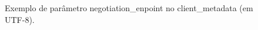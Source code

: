 \begin{figure}[htb]
    \caption{Exemplo de parâmetro negotiation\_enpoint no client\_metadata (em UTF-8).}
    \centering
    
    \label{fig:negotiation-endpoint}
\end{figure}
